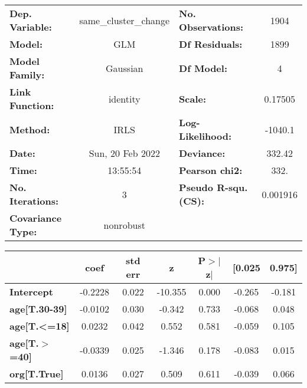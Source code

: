 \begin{center}
\begin{tabular}{lclc}
\toprule
\textbf{Dep. Variable:}   & same\_cluster\_change & \textbf{  No. Observations:  } &     1904    \\
\textbf{Model:}           &          GLM          & \textbf{  Df Residuals:      } &     1899    \\
\textbf{Model Family:}    &        Gaussian       & \textbf{  Df Model:          } &        4    \\
\textbf{Link Function:}   &        identity       & \textbf{  Scale:             } &   0.17505   \\
\textbf{Method:}          &          IRLS         & \textbf{  Log-Likelihood:    } &   -1040.1   \\
\textbf{Date:}            &    Sun, 20 Feb 2022   & \textbf{  Deviance:          } &    332.42   \\
\textbf{Time:}            &        13:55:54       & \textbf{  Pearson chi2:      } &     332.    \\
\textbf{No. Iterations:}  &           3           & \textbf{  Pseudo R-squ. (CS):} &  0.001916   \\
\textbf{Covariance Type:} &       nonrobust       & \textbf{                     } &             \\
\bottomrule
\end{tabular}
\begin{tabular}{lcccccc}
                       & \textbf{coef} & \textbf{std err} & \textbf{z} & \textbf{P$> |$z$|$} & \textbf{[0.025} & \textbf{0.975]}  \\
\midrule
\textbf{Intercept}     &      -0.2228  &        0.022     &   -10.355  &         0.000        &       -0.265    &       -0.181     \\
\textbf{age[T.30-39]}  &      -0.0102  &        0.030     &    -0.342  &         0.733        &       -0.068    &        0.048     \\
\textbf{age[T.<=18]}   &       0.0232  &        0.042     &     0.552  &         0.581        &       -0.059    &        0.105     \\
\textbf{age[T.$>$=40]} &      -0.0339  &        0.025     &    -1.346  &         0.178        &       -0.083    &        0.015     \\
\textbf{org[T.True]}   &       0.0136  &        0.027     &     0.509  &         0.611        &       -0.039    &        0.066     \\
\bottomrule
\end{tabular}
\end{center}